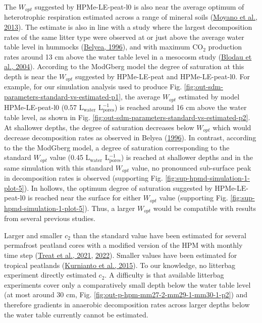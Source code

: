 \documentclass[
  12pt,
]{article}
\begin{document}
The \(W_{opt}\) suggested by HPMe-LE-peat-l0 is also near the average optimum of heterotrophic respiration estimated across a range of mineral soils (\protect\hyperlink{ref-Moyano.2013}{Moyano et al., 2013}). The estimate is also in line with a study where the largest decomposition rates of the same litter type were observed at or just above the average water table level in hummocks (\protect\hyperlink{ref-Belyea.1996}{Belyea, 1996}), and with maximum CO\(_2\) production rates around 13 cm above the water table level in a mesocosm study (\protect\hyperlink{ref-Blodau.2004}{Blodau et al., 2004}). According to the ModGberg model the degree of saturation at this depth is near the \(W_{opt}\) suggested by HPMe-LE-peat and HPMe-LE-peat-l0. For example, for our simulation analysis used to produce Fig. \ref{fig:out-sdm-parameters-standard-vs-estimated-p1}, the average \(W_{opt}\) estimated by model HPMe-LE-peat-l0 (0.57 L\(_\text{water}\) L\(_\text{pores}^{-1}\)) is reached around 16 cm above the water table level, as shown in Fig. \ref{fig:out-sdm-parameters-standard-vs-estimated-p2}. At shallower depths, the degree of saturation decreases below \(W_{opt}\) which would decrease decomposition rates as observed in Belyea (\protect\hyperlink{ref-Belyea.1996}{1996}). In contrast, according to the the ModGberg model, a degree of saturation corresponding to the standard \(W_{opt}\) value (0.45 L\(_\text{water}\) L\(_\text{pores}^{-1}\)) is reached at shallower depths and in the same simulation with this standard \(W_{opt}\) value, no pronounced sub-surface peak in decomposition rates is observed (supporting Fig. \ref{fig:sup-hpmd-simulation-1-plot-5}). In hollows, the optimum degree of saturation suggested by HPMe-LE-peat-l0 is reached near the surface for either \(W_{opt}\) value (supporting Fig. \ref{fig:sup-hpmd-simulation-1-plot-5}). Thus, a larger \(W_{opt}\) would be compatible with results from several previous studies.

Larger and smaller \(c_2\) than the standard value have been estimated for several permafrost peatland cores with a modified version of the HPM with monthly time step (\protect\hyperlink{ref-Treat.2021}{Treat et al., 2021}, \protect\hyperlink{ref-Treat.2022}{2022}). Smaller values have been estimated for tropical peatlands (\protect\hyperlink{ref-Kurnianto.2015}{Kurnianto et al., 2015}). To our knowledge, no litterbag experiment directly estimated \(c_2\). A difficulty is that available litterbag experiments cover only a comparatively small depth below the water table level (at most around 30 cm, Fig. \ref{fig:out-p-hpm-mm27-2-mm29-1-mm30-1-p2}) and therefore gradients in anaerobic decomposition rates across larger depths below the water table currently cannot be estimated.
\end{document}
